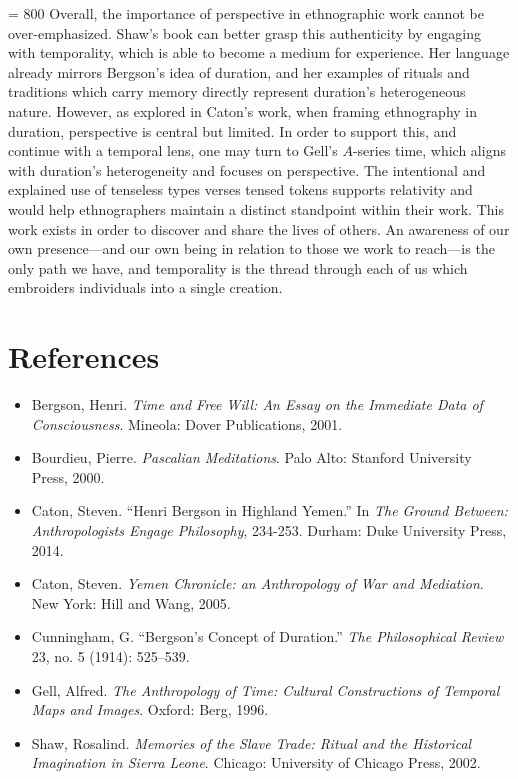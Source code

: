 \pretolerance = 800
Overall, the importance of perspective in ethnographic work cannot be
over-emphasized. Shaw's book can better grasp this authenticity by
engaging with temporality, which is able to become a medium for
experience. Her language already mirrors Bergson's idea of duration, and
her examples of rituals and traditions which carry memory directly
represent duration's heterogeneous nature. However, as explored in
Caton's work, when framing ethnography in duration, perspective is
central but limited. In order to support this, and continue with a
temporal lens, one may turn to Gell's $A$-series time, which aligns with
duration's heterogeneity and focuses on perspective. The intentional and
explained use of tenseless types verses tensed tokens supports
relativity and would help ethnographers maintain a distinct standpoint
within their work. This work exists in order to discover and share the
lives of others. An awareness of our own presence---and our own being in
relation to those we work to reach---is the only path we have, and
temporality is the thread through each of us which embroiders
individuals into a single creation.



\clearpage
\section*{References}
{
\small
\begin{itemize}[label={},itemindent=-2em,leftmargin=2em]	
	\item Bergson, Henri. \emph{Time and Free Will: An Essay on the Immediate Data
of Consciousness}. Mineola: Dover Publications, 2001.

	\item Bourdieu, Pierre. \emph{Pascalian Meditations}. Palo Alto: Stanford
University Press, 2000.

	\item Caton, Steven. ``Henri Bergson in Highland Yemen.'' In \emph{The Ground
Between: Anthropologists Engage Philosophy}, 234-253. Durham: Duke
University Press, 2014.

	\item Caton, Steven. \emph{Yemen Chronicle: an Anthropology of War and
Mediation}. New York: Hill and Wang, 2005.

	\item Cunningham, G. ``Bergson's Concept of Duration.'' \emph{The
Philosophical Review} 23, no. 5 (1914): 525--539.

	\item Gell, Alfred. \emph{The Anthropology of Time: Cultural Constructions of
Temporal Maps and Images}. Oxford: Berg, 1996.

	\item Shaw, Rosalind. \emph{Memories of the Slave Trade: Ritual and the
Historical Imagination in Sierra Leone}. Chicago: University of Chicago
Press, 2002.

\end{itemize}
}
